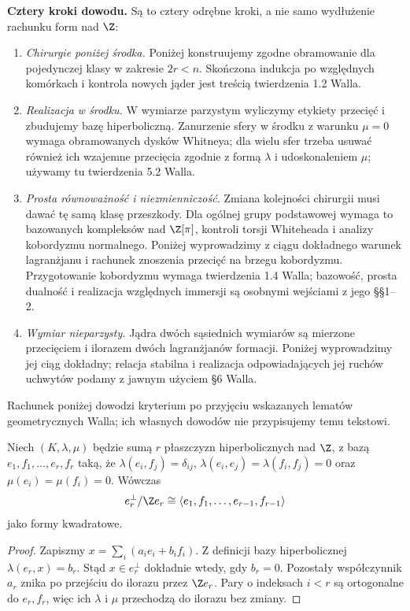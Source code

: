\noindent\textbf{Cztery kroki dowodu.}
Są to cztery odrębne kroki, a nie samo
wydłużenie rachunku form nad $\Z$:
\begin{enumerate}[label=(\arabic*)]
\item \emph{Chirurgie poniżej środka.}
  Poniżej konstruujemy zgodne obramowanie
  dla pojedynczej klasy w zakresie $2r<n$.
  Skończona indukcja po względnych komórkach
  i kontrola nowych jąder jest treścią
  twierdzenia 1.2 Walla.
\item \emph{Realizacja w środku.}
  W wymiarze parzystym wyliczymy etykiety przecięć i zbudujemy
  bazę hiperboliczną. Zanurzenie sfery w środku
  z warunku $\mu=0$ wymaga obramowanych dysków
  Whitneya; dla wielu sfer trzeba usuwać
  również ich wzajemne przecięcia zgodnie
  z formą $\lambda$ i udoskonaleniem $\mu$;
  używamy tu twierdzenia 5.2 Walla.
\item \emph{Prosta równoważność i niezmienniczość.}
  Zmiana kolejności chirurgii musi dawać
  tę samą klasę przeszkody. Dla ogólnej
  grupy podstawowej wymaga to bazowanych
  kompleksów nad $\Z[\pi]$, kontroli torsji
  Whiteheada i analizy kobordyzmu normalnego.
  Poniżej wyprowadzimy z ciągu dokładnego
  warunek lagranżjanu i rachunek znoszenia
  przecięć na brzegu kobordyzmu. Przygotowanie
  kobordyzmu wymaga twierdzenia 1.4 Walla;
  bazowość, prosta dualność i realizacja
  względnych immersji są osobnymi wejściami
  z jego §§1--2.
\item \emph{Wymiar nieparzysty.}
  Jądra dwóch sąsiednich wymiarów są mierzone
  przecięciem i ilorazem dwóch lagranżjanów
  formacji. Poniżej wyprowadzimy jej ciąg
  dokładny; relacja stabilna i realizacja
  odpowiadających jej ruchów uchwytów
  podamy z jawnym użyciem §6 Walla.
\end{enumerate}
Rachunek poniżej dowodzi kryterium po przyjęciu
wskazanych lematów geometrycznych Walla;
ich własnych dowodów nie przypisujemy temu tekstowi.

\begin{lemat}
\label{lem:para-Wall-22}
Niech $(K,\lambda,\mu)$ będzie sumą $r$ płaszczyzn
hiperbolicznych nad $\Z$, z bazą
$e_1,f_1,\ldots,e_r,f_r$ taką, że
$\lambda(e_i,f_j)=\delta_{ij}$,
$\lambda(e_i,e_j)=\lambda(f_i,f_j)=0$
oraz $\mu(e_i)=\mu(f_i)=0$.
Wówczas
\[
 e_r^\perp/\Z e_r
 \cong\langle e_1,f_1,\ldots,e_{r-1},f_{r-1}\rangle
\]
jako formy kwadratowe.
\end{lemat}
\begin{proof}
Zapiszmy
$x=\sum_i(a_i e_i+b_i f_i)$.
Z definicji bazy hiperbolicznej
$\lambda(e_r,x)=b_r$. Stąd $x\in e_r^\perp$
dokładnie wtedy, gdy $b_r=0$.
Pozostały współczynnik $a_r$ znika po
przejściu do ilorazu przez $\Z e_r$.
Pary o indeksach $i<r$ są ortogonalne
do $e_r,f_r$, więc ich $\lambda$ i $\mu$
przechodzą do ilorazu bez zmiany.
\end{proof}

